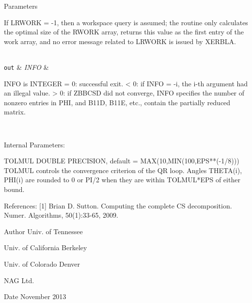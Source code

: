 \begin{DoxyParams}[1]{Parameters}
\begin{DoxyVerb}
          If LRWORK = -1, then a workspace query is assumed; the
          routine only calculates the optimal size of the RWORK array,
          returns this value as the first entry of the work array, and
          no error message related to LRWORK is issued by XERBLA.\end{DoxyVerb}
\\
\hline
\mbox{\tt out}  & {\em I\+N\+F\+O} & \begin{DoxyVerb}          INFO is INTEGER
          = 0:  successful exit.
          < 0:  if INFO = -i, the i-th argument had an illegal value.
          > 0:  if ZBBCSD did not converge, INFO specifies the number
                of nonzero entries in PHI, and B11D, B11E, etc.,
                contain the partially reduced matrix.\end{DoxyVerb}
 \\
\hline
\end{DoxyParams}
\begin{DoxyParagraph}{Internal Parameters\+: }
\begin{DoxyVerb}  TOLMUL  DOUBLE PRECISION, default = MAX(10,MIN(100,EPS**(-1/8)))
          TOLMUL controls the convergence criterion of the QR loop.
          Angles THETA(i), PHI(i) are rounded to 0 or PI/2 when they
          are within TOLMUL*EPS of either bound.\end{DoxyVerb}
 
\end{DoxyParagraph}
\begin{DoxyParagraph}{References\+: }
\mbox{[}1\mbox{]} Brian D. Sutton. Computing the complete C\+S decomposition. Numer. Algorithms, 50(1)\+:33-\/65, 2009. 
\end{DoxyParagraph}
\begin{DoxyAuthor}{Author}
Univ. of Tennessee 

Univ. of California Berkeley 

Univ. of Colorado Denver 

N\+A\+G Ltd. 
\end{DoxyAuthor}
\begin{DoxyDate}{Date}
November 2013 
\end{DoxyDate}
